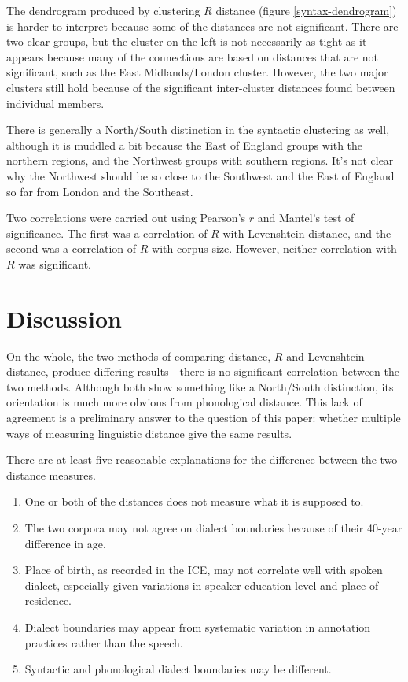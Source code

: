 \documentclass[11pt]{article}
\begin{document}
The dendrogram produced by clustering $R$ distance (figure
\ref{syntax-dendrogram}) is harder to interpret because some of the
distances are not significant. There are two clear groups, but the
cluster on the left is not necessarily as tight as it appears because
many of the connections are based on distances that are not
significant, such as the East Midlands/London cluster. However, the
two major clusters still hold because of the significant inter-cluster
distances found between individual members.

There is generally a North/South distinction in the syntactic
clustering as well, although it is muddled a bit because the East of
England groups with the northern regions, and the Northwest groups
with southern regions. It's not clear why the Northwest should be so
close to the Southwest and the East of England so far from London and
the Southeast.

Two correlations were carried out using Pearson's $r$ and Mantel's test of
significance. The first was a correlation of $R$ with Levenshtein
distance, and the second was a correlation of $R$ with corpus
size. However, neither correlation with $R$ was significant.

\section{Discussion}

On the whole, the two methods of comparing distance, $R$ and
Levenshtein distance, produce differing results---there is no
significant correlation between the two methods. Although both show
something like a North/South distinction, its orientation is much more
obvious from phonological distance. This lack of agreement is a
preliminary answer to the question of this paper: whether multiple
ways of measuring linguistic distance give the same results.

There are at least five reasonable explanations for the difference
between the two distance measures.

\begin{enumerate}
\item One or both of the distances does not measure what it is supposed to.
\item The two corpora may not agree on dialect boundaries because of
  their 40-year difference in age.
\item Place of birth, as recorded in the ICE, may not correlate well
  with spoken dialect, especially given variations in speaker
  education level and place of residence.
\item Dialect boundaries may appear from systematic variation in
  annotation practices rather than the speech.
\item Syntactic and phonological dialect boundaries may be different.
\end{enumerate}
\end{document}
